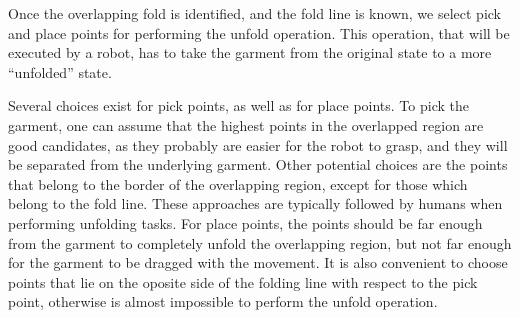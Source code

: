 Once the overlapping fold is identified, and the fold line is known, we select pick and place points for performing the unfold operation. This operation, that will be executed by a robot, has to take the garment from the original state to a more ``unfolded'' state.

Several choices exist for pick points, as well as for place points. To pick the garment, one can assume that the highest points in the overlapped region are good candidates, as they probably are easier for the robot to grasp, and they will be separated from the underlying garment. Other potential choices are the points that belong to the border of the overlapping region, except for those which belong to the fold line. These approaches are typically followed by humans when performing unfolding tasks. For place points, the points should be far enough from the garment to completely unfold the overlapping region, but not far enough for the garment to be dragged with the movement. It is also convenient to choose points that lie on the oposite side of the folding line with respect to the pick point, otherwise is almost impossible to perform the unfold operation.